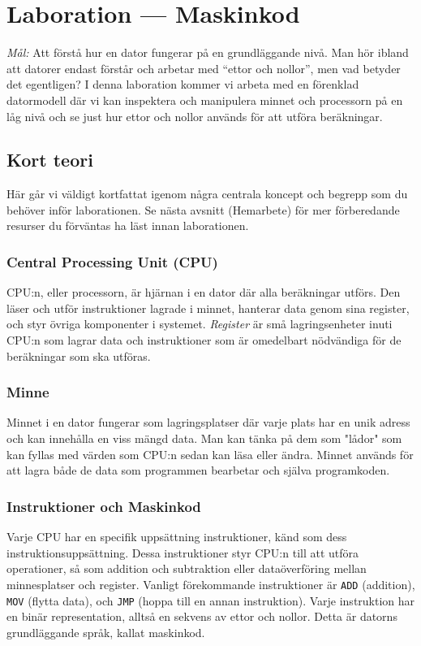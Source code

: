 
\section{Laboration  --- Maskinkod}

\emph{Mål:} Att förstå hur en dator fungerar på en grundläggande nivå. Man hör ibland att datorer endast förstår och arbetar med ``ettor och nollor'', men vad betyder det egentligen? I denna laboration kommer vi arbeta med en förenklad datormodell där vi kan inspektera och manipulera minnet och processorn på en låg nivå och se just hur ettor och nollor används för att utföra beräkningar.

\subsection{Kort teori}
Här går vi väldigt kortfattat igenom några centrala koncept och begrepp som du behöver inför laborationen. Se nästa avsnitt (Hemarbete) för mer förberedande resurser du förväntas ha läst innan laborationen.

\subsubsection{Central Processing Unit (CPU)}
CPU:n, eller processorn, är hjärnan i en dator där alla beräkningar utförs. Den läser och utför instruktioner lagrade i minnet, hanterar data genom sina register, och styr övriga komponenter i systemet. \emph{Register} är små lagringsenheter inuti CPU:n som lagrar data och instruktioner som är omedelbart nödvändiga för de beräkningar som ska utföras.

\subsubsection{Minne}
Minnet i en dator fungerar som lagringsplatser där varje plats har en unik adress och kan innehålla en viss mängd data. Man kan tänka på dem som "lådor" som kan fyllas med värden som CPU:n sedan kan läsa eller ändra. Minnet används för att lagra både de data som programmen bearbetar och själva programkoden.

\subsubsection{Instruktioner och Maskinkod}
Varje CPU har en specifik uppsättning instruktioner, känd som dess instruktionsuppsättning. Dessa instruktioner styr CPU:n till att utföra operationer, så som addition och subtraktion eller dataöverföring mellan minnesplatser och register. Vanligt förekommande instruktioner är \texttt{ADD} (addition), \texttt{MOV} (flytta data), och \texttt{JMP} (hoppa till en annan instruktion). Varje instruktion har en binär representation, alltså en sekvens av ettor och nollor. Detta är datorns grundläggande språk, kallat maskinkod.

